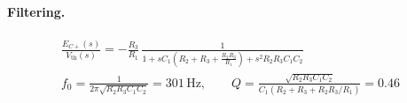 \documentclass[11pt, letterpaper,titlepage]{article}
\begin{document}
\paragraph{Filtering.}
\begin{gather}
    \frac{E_{C+}(s)}{V_\text{th}(s)} = -\frac{R_3}{R_1}\,
    \frac{1}{1 + sC_1\!\left(R_2 + R_3 + \frac{R_2R_3}{R_1}\right) + s^2R_2R_3C_1C_2}
    \label{eq:mfb}\\
    f_0 = \frac{1}{2\pi\sqrt{R_2R_3C_1C_2}} = 301\,\mathrm{Hz}, \qquad
    Q = \frac{\sqrt{R_2R_3C_1C_2}}{C_1\left(R_2 + R_3 + R_2R_3/R_1\right)} = 0.46
    \label{eq:mfb-f0q}
\end{gather}
\end{document}
